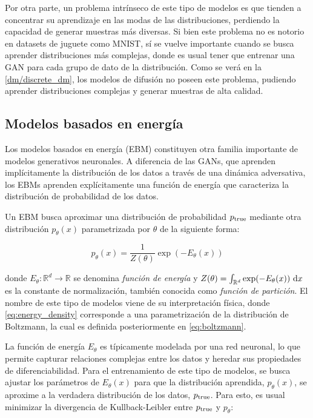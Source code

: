 Por otra parte, un problema intrínseco de este tipo de modelos es que tienden a concentrar su aprendizaje en las modas de las distribuciones, perdiendo la capacidad de generar muestras más diversas. Si bien este problema no es notorio en datasets de juguete como MNIST, sí se vuelve importante cuando se busca aprender distribuciones más complejas, donde es usual tener que entrenar una GAN para cada grupo de dato de la distribución. Como se verá en la \autoref{dm/discrete_dm}, los modelos de difusión no poseen este problema, pudiendo aprender distribuciones complejas y generar muestras de alta calidad.

\subsection{Modelos basados en energía}
\label{dm/generative_models/ebm}

Los modelos basados en energía (EBM) constituyen otra familia importante de modelos generativos neuronales. A diferencia de las GANs, que aprenden implícitamente la distribución de los datos a través de una dinámica adversativa, los EBMs aprenden explícitamente una función de energía que caracteriza la distribución de probabilidad de los datos.

Un EBM busca aproximar una distribución de probabilidad $p_{\operatorname{true}}$ mediante otra distribución $p_\theta(x)$ parametrizada por $\theta$ de la siguiente forma:

\begin{equation}
    \label{eq:energy_density}
    p_\theta(x) = \frac{1}{Z(\theta)} \exp(-E_\theta(x))
\end{equation}

donde $E_\theta: \mathbb{R}^d \to \mathbb{R}$ se denomina \textit{función de energía} y $Z(\theta) = \int_{\mathbb{R}^d} \exp(-E_\theta(x)) \,\operatorname{d}\! x$ es la constante de normalización, también conocida como \textit{función de partición}. El nombre de este tipo de modelos viene de su interpretación física, donde \eqref{eq:energy_density} corresponde a una parametrización de la distribución de Boltzmann, la cual es definida posteriormente en \eqref{eq:boltzmann}.

La función de energía $E_\theta$ es típicamente modelada por una red neuronal, lo que permite capturar relaciones complejas entre los datos y heredar sus propiedades de diferenciabilidad. Para el entrenamiento de este tipo de modelos, se busca ajustar los parámetros de $E_\theta(x)$ para que la distribución aprendida, $p_\theta(x)$, se aproxime a la verdadera distribución de los datos, $p_{\operatorname{true}}$. Para esto, es usual minimizar la divergencia de Kullback-Leibler entre $p_{\operatorname{true}}$ y $p_\theta$:

